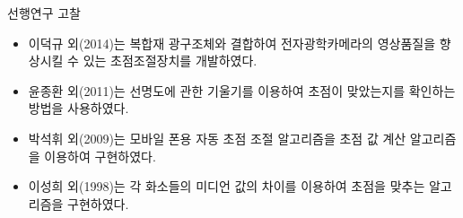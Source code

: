 \documentclass{gshs_poster_beamer}
\begin{document}
\begin{columns}[T]

\begin{posterbox}[colbacktitle=green!50,coltitle=black,colback=green!5]{선행연구 고찰}
	\begin{itemize}
		\item 이덕규 외(2014)는 복합재 광구조체와 결합하여 전자광학카메라의 영상품질을 향상시킬 수 있는 초점조절장치를 개발하였다.\cite{leedukgu2014}
		\item 윤종환 외(2011)는 선명도에 관한 기울기를 이용하여 초점이 맞았는지를 확인하는 방법을 사용하였다.\cite{yunjonghwan2011lcd}
		\item 박석휘 외(2009)는 모바일 폰용 자동 초점 조절 알고리즘을 초점 값 계산 알고리즘을 이용하여 구현하였다.\cite{parksukhui2009Median}
		\item 이성희 외(1998)는 각 화소들의 미디언 값의 차이를 이용하여 초점을 맞추는 알고리즘을 구현하였다.\cite{leeseonghee1998Median}
	\end{itemize}
\end{posterbox}

\vspace{1em}


\end{columns}
\end{document}
